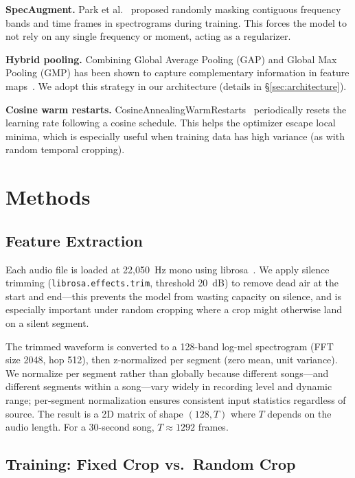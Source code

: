 \textbf{SpecAugment.}
Park et al.~\cite{park2019specaugment} proposed randomly masking contiguous frequency bands and time frames in spectrograms during training. This forces the model to not rely on any single frequency or moment, acting as a regularizer.

\textbf{Hybrid pooling.}
Combining Global Average Pooling (GAP) and Global Max Pooling (GMP) has been shown to capture complementary information in feature maps~\cite{woo2018cbam}. We adopt this strategy in our architecture (details in \S\ref{sec:architecture}).

\textbf{Cosine warm restarts.}
CosineAnnealingWarmRestarts~\cite{loshchilov2017sgdr} periodically resets the learning rate following a cosine schedule. This helps the optimizer escape local minima, which is especially useful when training data has high variance (as with random temporal cropping).

\section{Methods}

\subsection{Feature Extraction}

Each audio file is loaded at 22,050~Hz mono using librosa~\cite{mcfee2015librosa}. We apply silence trimming (\texttt{librosa.effects.trim}, threshold 20~dB) to remove dead air at the start and end---this prevents the model from wasting capacity on silence, and is especially important under random cropping where a crop might otherwise land on a silent segment.

The trimmed waveform is converted to a 128-band log-mel spectrogram (FFT size 2048, hop 512), then z-normalized per segment (zero mean, unit variance). We normalize per segment rather than globally because different songs---and different segments within a song---vary widely in recording level and dynamic range; per-segment normalization ensures consistent input statistics regardless of source. The result is a 2D matrix of shape $(128, T)$ where $T$ depends on the audio length. For a 30-second song, $T \approx 1292$ frames.

\subsection{Training: Fixed Crop vs.\ Random Crop}

